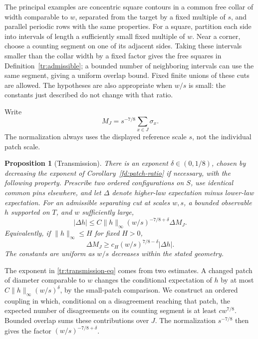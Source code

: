 \documentclass[11pt]{article}
\newtheorem{proposition}[theorem]{Proposition}
\theoremstyle{definition}
\theoremstyle{remark}
\numberwithin{equation}{section}
\begin{document}
The principal examples are concentric square contours in a common free
collar of width comparable to $w$, separated from the target by a fixed
multiple of $s$, and parallel periodic rows with the same properties.
For a square, partition each side into intervals of length a sufficiently
small fixed multiple of $w$. Near a corner, choose a counting segment on
one of its adjacent sides. Taking these intervals smaller than the collar
width by a fixed factor gives the free squares in
Definition~\ref{tr:admissible}; a bounded number of neighboring intervals
can use the same segment, giving a uniform overlap bound. Fixed finite
unions of these cuts are allowed. The hypotheses are also appropriate
when $w/s$ is small: the constants just described do not change with that
ratio.

Write
\begin{equation}
\label{tr:magnetization-definition}
 M_J=s^{-7/8}\sum_{x\in J}\sigma_x.
\end{equation}
The normalization always uses the displayed reference scale $s$, not
the individual patch scale.

\begin{proposition}[Transmission]
\label{tr:transmission}
There is an exponent $\delta\in(0,1/8)$, chosen by decreasing the exponent
of Corollary~\ref{fd:patch-ratio} if necessary, with the following property.
Prescribe two ordered configurations on $S$, use identical common pins
elsewhere, and let $\Delta$ denote higher-law expectation minus lower-law
expectation. For an admissible separating cut at scales $w,s$, a bounded
observable $h$ supported on $T$, and $w$ sufficiently large,
\begin{equation}
\label{tr:transmission-eq}
 |\Delta h|
 \leq C\|h\|_\infty (w/s)^{-7/8+\delta}\Delta M_J.
\end{equation}
Equivalently, if $\|h\|_\infty\leq H$ for fixed $H>0$,
\begin{equation}
\label{tr:transmission-lower}
 \Delta M_J\geq c_H (w/s)^{7/8-\delta}|\Delta h|.
\end{equation}
The constants are uniform as $w/s$ decreases within the stated geometry.
\end{proposition}

The exponent in \eqref{tr:transmission-eq} comes from two estimates.
A changed patch of diameter comparable to $w$ changes the conditional
expectation of $h$ by at most $C\|h\|_\infty(w/s)^\delta$, by the
small-patch comparison. We construct an ordered coupling in which,
conditional on a disagreement reaching that patch, the expected number
of disagreements on its counting segment is at least $cw^{7/8}$. Bounded overlap sums these contributions over
$J$. The normalization $s^{-7/8}$ then gives the factor
$(w/s)^{-7/8+\delta}$.
\end{document}
